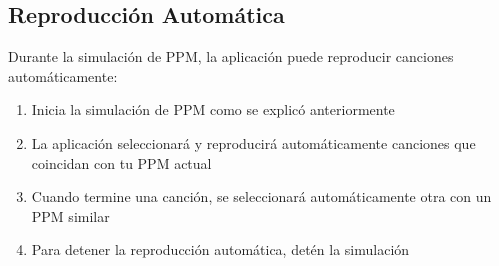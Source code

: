 \documentclass[a4paper,12pt]{article}
\begin{document}



\subsection{Reproducción Automática}
Durante la simulación de PPM, la aplicación puede reproducir canciones automáticamente:
\begin{enumerate}
    \item Inicia la simulación de PPM como se explicó anteriormente
    \item La aplicación seleccionará y reproducirá automáticamente canciones que coincidan con tu PPM actual
    \item Cuando termine una canción, se seleccionará automáticamente otra con un PPM similar
    \item Para detener la reproducción automática, detén la simulación
\end{enumerate}
\end{document}
